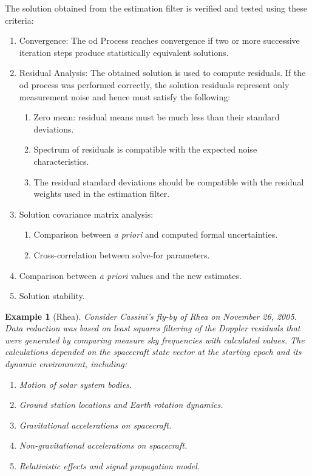 \documentclass{article}
\theoremstyle{mystyle}
\newtheorem{example}{Example}[section]
\begin{document}
\noindent The solution obtained from the estimation filter is verified and tested using these criteria:
\begin{enumerate}[itemsep=0pt]
\item Convergence: The \gls{od} Process reaches convergence if two or more successive iteration steps produce statistically equivalent solutions.
\item Residual Analysis: The obtained solution is used to compute \glspl{residual}. If the \gls{od} process was performed correctly, the solution \glspl{residual} represent only measurement noise and hence must satisfy the following:
\begin{enumerate}[itemsep=0pt]
\item Zero mean: \Gls{residual} means must be much less than their standard deviations.
\item Spectrum of \glspl{residual} is compatible with the expected noise characteristics.
\item The \gls{residual} standard deviations should be compatible with the \gls{residual} \break weights used in the estimation filter.
\end{enumerate}
\item Solution \gls{covariance matrix} analysis:
\begin{enumerate}[itemsep=0pt]
\item Comparison between \textit{a priori} and computed formal uncertainties.
\item Cross-correlation between \gls{solve-for parameters}.
\end{enumerate}
\item Comparison between \textit{a priori} values and the new estimates.
\item Solution stability.
\end{enumerate}

\begin{example}[Rhea] Consider Cassini's fly-by of Rhea on November 26, 2005. Data reduction was based on least squares filtering of the Doppler residuals that were generated by comparing measure sky frequencies with calculated values. The calculations depended on the spacecraft state vector at the starting epoch and its dynamic environment, including:
\begin{enumerate}[itemsep=0pt]
\item Motion of solar system bodies.
\item Ground station locations and Earth rotation dynamics.
\item Gravitational accelerations on spacecraft.
\item Non-gravitational accelerations on spacecraft.
\item Relativistic effects and signal propagation model.
\end{enumerate}
\end{example}
\end{document}
